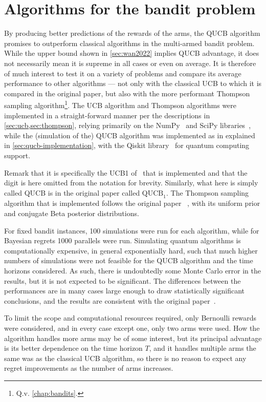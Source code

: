 \section{Algorithms for the bandit problem}
By producing better predictions of the rewards of the arms, the QUCB algorithm promises to outperform classical algorithms in the multi-armed bandit problem.
While the upper bound shown in \cref{sec:wan2022} implies QUCB advantage, it does not necessarily mean it is supreme in all cases or even on average.
It is therefore of much interest to test it on a variety of problems and compare its average performance to other algorithms — not only with the classical UCB to which it is compared in the original paper, but also with the more performant Thompson sampling algorithm\footnote{Q.v. \cref{chap:bandits}.}.
The UCB algorithm and Thompson algorithms were implemented in a straight-forward manner per the descriptions in \cref{sec:ucb,sec:thompson}, relying primarily on the NumPy~\autocite{numpy} and SciPy libraries~\autocite{scipy}, while the (simulation of the) QUCB algorithm was implemented as in explained in \cref{sec:qucb-implementation}, with the Qiskit library~\autocite{qiskit} for quantum computing support.

Remark that it is specifically the UCB1 of~\autocite{auer2002} that is implemented and that the digit is here omitted from the notation for brevity.
Similarly, what here is simply called QUCB is in the original paper called $\text{QUCB}_1$.
The Thompson sampling algorithm that is implemented follows the original paper ~\autocite{thompson1933}, with its uniform prior and conjugate Beta posterior distributions.

For fixed bandit instances, 100 simulations were run for each algorithm, while for Bayesian regrets 1000 parallels were run.
Simulating quantum algorithms is computationally expensive, in general exponentially hard, such that much higher numbers of simulations were not feasible for the QUCB algorithm and the time horizons considered.
As such, there is undoubtedly some Monte Carlo error in the results, but it is not expected to be significant.
The differences between the performances are in many cases large enough to draw statistically significant conclusions, and the results are consistent with the original paper~\autocite{wan2022}.

To limit the scope and computational resources required, only Bernoulli rewards were considered, and in every case except one, only two arms were used.
How the algorithm handles more arms may be of some interest, but its principal advantage is its better dependence on the time horizon $T$, and it handles multiple arms the same was as the classical UCB algorithm, so there is no reason to expect any regret improvements as the number of arms increases.

